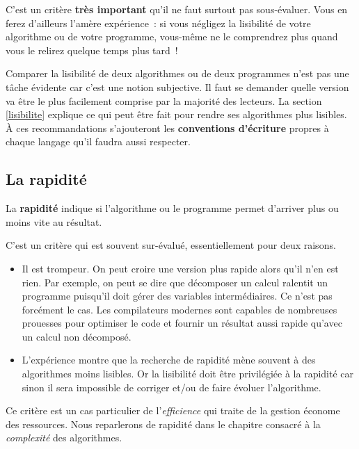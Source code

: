 			C’est un critère \textbf{très important} qu’il ne faut surtout pas
			sous-évaluer.  Vous en ferez d’ailleurs l’amère expérience~: si vous
			négligez la lisibilité de votre algorithme ou de votre programme,
			vous-même ne le comprendrez plus quand vous le relirez quelque temps
			plus tard~!
			
			Comparer la lisibilité de deux algorithmes ou de deux programmes
			n’est pas une tâche évidente car c’est une notion subjective.  Il
			faut se demander quelle version va être le plus facilement comprise
			par la majorité des lecteurs. La section \vref{lisibilite}
			explique ce qui peut être fait pour rendre ses algorithmes plus
			lisibles. À ces recommandations s'ajouteront les \textbf{conventions
			d'écriture} propres à chaque langage qu'il faudra aussi respecter. 
				
		\subsection{La rapidité}
	    
			
			La \textbf{rapidité} indique si l’algorithme ou le programme permet
			d’arriver plus ou moins vite au résultat.
			
			C’est un critère qui est souvent sur-évalué, 
			essentiellement pour deux raisons.
			\begin{itemize}
				\item 
					Il est trompeur. 
					On peut croire une version plus rapide alors qu’il n’en est rien.
					Par exemple, on peut se dire que décomposer un calcul
					ralentit un programme puisqu’il doit gérer des variables
					intermédiaires.
					Ce n’est pas forcément le cas.
					Les compilateurs modernes sont capables
					de nombreuses prouesses pour optimiser le code
					et fournir un résultat aussi rapide
					qu’avec un calcul non décomposé.
				\item
					L’expérience montre que la recherche de rapidité
					mène souvent à des algorithmes moins lisibles.
					Or la lisibilité doit être privilégiée à la rapidité
					car sinon il sera impossible de corriger et/ou
					de faire évoluer l’algorithme.
			\end{itemize}
		
			Ce critère est un cas particulier de l’\emph{efficience} qui traite
			de la gestion économe des ressources.  Nous reparlerons de rapidité
			dans le chapitre consacré à la \emph{complexité} des algorithmes.

